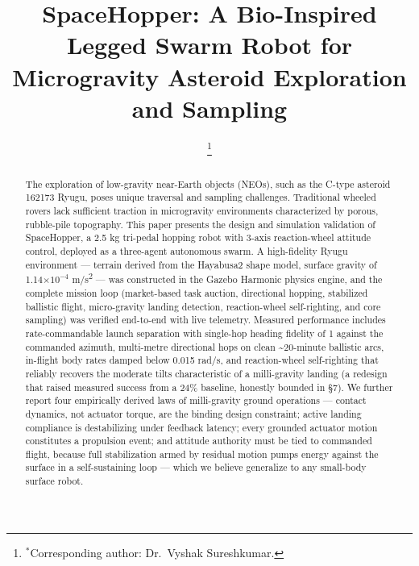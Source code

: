 \documentclass[conference]{IEEEtran}
\begin{document}
\title{SpaceHopper: A Bio-Inspired Legged Swarm Robot for Microgravity Asteroid Exploration and Sampling}
\author{
\thanks{$^{*}$Corresponding author: Dr.~Vyshak Sureshkumar.}}
\maketitle
\begin{abstract}
The exploration of low-gravity near-Earth objects (NEOs), such as the C-type asteroid 162173 Ryugu, poses unique traversal and sampling challenges. Traditional wheeled rovers lack sufficient traction in microgravity environments characterized by porous, rubble-pile topography. This paper presents the design and simulation validation of SpaceHopper, a 2.5 kg tri-pedal hopping robot with 3-axis reaction-wheel attitude control, deployed as a three-agent autonomous swarm. A high-fidelity Ryugu environment --- terrain derived from the Hayabusa2 shape model, surface gravity of 1.14\ensuremath{\times}\ensuremath{10^{-4}} m/s\textsuperscript{2} --- was constructed in the Gazebo Harmonic physics engine, and the complete mission loop (market-based task auction, directional hopping, stabilized ballistic flight, micro-gravity landing detection, reaction-wheel self-righting, and core sampling) was verified end-to-end with live telemetry. Measured performance includes rate-commandable launch separation with single-hop heading fidelity of 1\textdegree{} against the commanded azimuth, multi-metre directional hops on clean \textasciitilde{}20-minute ballistic arcs, in-flight body rates damped below 0.015 rad/s, and reaction-wheel self-righting that reliably recovers the moderate tilts characteristic of a milli-gravity landing (a redesign that raised measured success from a 24\% baseline, honestly bounded in \S7). We further report four empirically derived laws of milli-gravity ground operations --- contact dynamics, not actuator torque, are the binding design constraint; active landing compliance is destabilizing under feedback latency; every grounded actuator motion constitutes a propulsion event; and attitude authority must be tied to commanded flight, because full stabilization armed by residual motion pumps energy against the surface in a self-sustaining loop --- which we believe generalize to any small-body surface robot.
\end{abstract}
\end{document}
